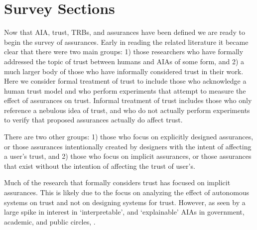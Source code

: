 

\section{Survey Sections} \label{sec:survey}
Now that AIA, trust, TRBs, and assurances have been defined we are ready to begin the survey of assurances. Early in reading the related literature it became clear that there were two main groups: 1) those researchers who have formally addressed the topic of trust between humans and AIAs of some form, and 2) a much larger body of those who have informally considered trust in their work. Here we consider formal treatment of trust to include those who acknowledge a human trust model and who perform experiments that attempt to measure the effect of assurances on trust. Informal treatment of trust includes those who only reference a nebulous idea of trust, and who do not actually perform experiments to verify that proposed assurances actually do affect trust. 

There are two other  groups: 1) those who focus on explicitly designed assurances, or those assurances intentionally created by designers with the intent of affecting a user's trust, and 2) those who focus on implicit assurances, or those assurances that exist without the  intention of affecting the trust of user's. 

Much of the research that formally considers trust has focused on implicit assurances. This is likely due to the focus on analyzing the effect of autonomous systems on trust and not on designing systems for trust. However, as seen by a large spike in interest in `interpretable', and `explainable' AIAs in government, academic, and public circles, . 

